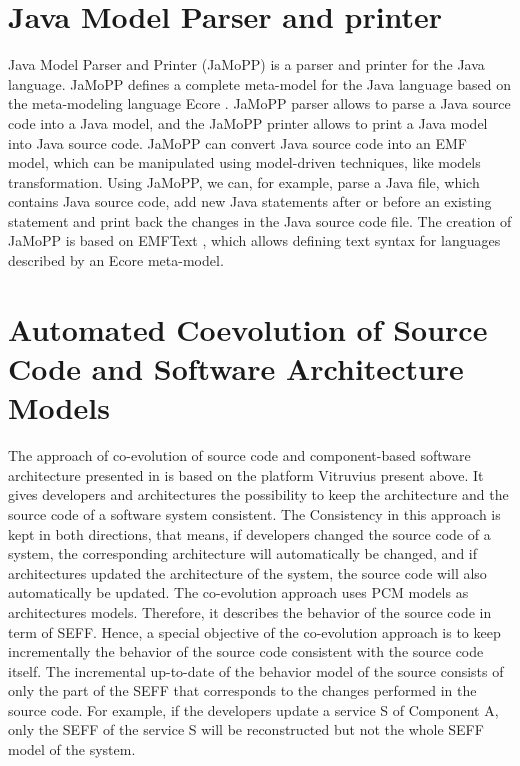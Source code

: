 \section{Java Model Parser and printer}
\label{sec:Java Model Parser and printer}

Java Model Parser and Printer (JaMoPP) \cite{heidenreich2009closing} is a parser and printer for the Java language. JaMoPP defines a complete meta-model for the Java language based on the meta-modeling language Ecore \cite{steinberg2008emf}. JaMoPP parser allows to parse a Java source code into a Java model, and the JaMoPP printer allows to print a Java model into Java source code. JaMoPP can convert Java source code into an EMF model, which can be manipulated using model-driven techniques, like models transformation. Using JaMoPP, we can, for example, parse a Java file, which contains Java source code, add new Java statements after or before an existing statement and print back the changes in the Java source code file. The creation of JaMoPP is based on EMFText \cite{heidenreich2009derivation}, which allows defining text syntax for languages described by an Ecore meta-model. 


\section{Automated Coevolution of Source Code and Software Architecture Models}
\label{sec:Automated Coevolution of Source Code and Software Architecture Models}
The approach of co-evolution of source code and component-based software architecture presented in \cite{langhammer2015co, langhammer2017automated} is based on the platform Vitruvius present above. It gives developers and architectures the possibility to keep the architecture and the source code of a software system consistent. The Consistency in this approach is kept in both directions, that means, if developers changed the source code of a system, the corresponding architecture will automatically be changed, and if architectures updated the architecture of the system, the source code will also automatically be updated. The co-evolution approach uses PCM models as architectures models.  Therefore, it describes the behavior of the source code in term of SEFF. Hence, a special objective of the co-evolution approach is to keep incrementally the behavior of the source code consistent with the source code itself. The incremental up-to-date of the behavior model of the source consists of only the part of the SEFF that corresponds to the changes performed in the source code. For example, if the developers update a service S of Component A, only the SEFF of the service S will be reconstructed but not the whole SEFF model of the system. 

